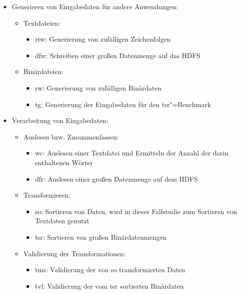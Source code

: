 \begin{itemize}
    \item Generieren von Eingabedaten für andere Anwendungen:
    \begin{itemize}
        \item Textdateien:
        \begin{itemize}
            \item \gls{rtw}: Generierung von zufälligen Zeichenfolgen
            \item \gls{dfw}: Schreiben einer großen Datenmenge auf das \gls{HDFS}
        \end{itemize}
        \item Binärdateien:
        \begin{itemize}
            \item \gls{rw}: Generierung von zufälligen Binärdaten
            \item \gls{tg}: Generierung der Eingabedaten für den \acrlong{tsr}"=Benchmark
       \end{itemize}
    \end{itemize}

    \item Verarbeitung von Eingabedaten:
    \begin{itemize}
        \item Auslesen bzw. Zusammenfassen:
        \begin{itemize}
            \item \gls{wc}: Auslesen einer Textdatei und Ermitteln der Anzahl der darin enthaltenen Wörter
            \item \gls{dfr}: Auslesen einer großen Datenmenge auf dem \gls{HDFS}
        \end{itemize}
        \item Transformieren:
        \begin{itemize}
            \item \gls{so}: Sortieren von Daten, wird in dieser Fallstudie zum Sortieren von Textdaten genutzt
            \item \gls{tsr}: Sortieren von großen Binärdatenmengen
        \end{itemize}
        \item Validierung der Transformationen:
        \begin{itemize}
            \item \gls{tms}: Validierung der von \acrlong{so} transformierten Daten
            \item \gls{tvl}: Validierung der vom \acrlong{tsr} sortierten Binärdaten
        \end{itemize}
    \end{itemize}


\end{itemize}
